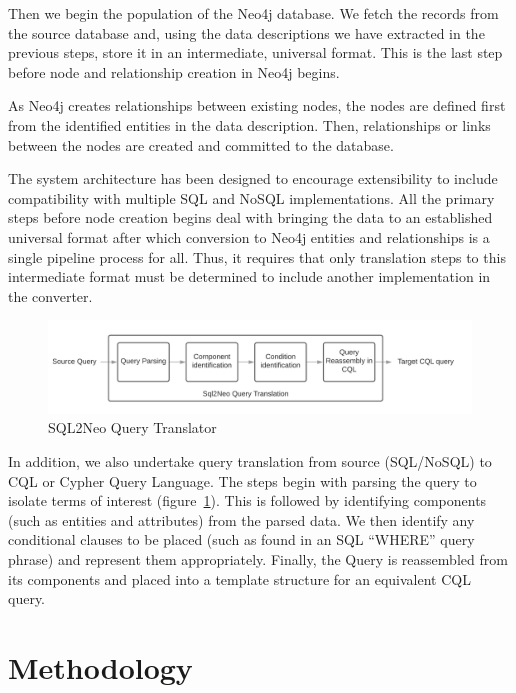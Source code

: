 \documentclass[12pt]{article}
\newcommand{\sectionfontstyle}{\fontsize{16pt}{1em}\usefont{T1}{phv}{b}{n}}
\begin{document}
    Then we begin the population of the Neo4j database. We fetch the records from the source database and, using the data descriptions we have extracted in the previous steps, store it in an intermediate, universal format. This is the last step before node and relationship creation in Neo4j begins.
    
    As Neo4j creates relationships between existing nodes, the nodes are defined first from the identified entities in the data description. Then, relationships or links between the nodes are created and committed to the database.
    
    The system architecture has been designed to encourage extensibility to include compatibility with multiple SQL and NoSQL implementations. All the primary steps before node creation begins deal with bringing the data to an established universal format after which conversion to Neo4j entities and relationships is a single pipeline process for all. Thus, it requires that only translation steps to this intermediate format must be determined to include another implementation in the converter.
    
    \begin{figure}[htb!]
        \centering
        \includegraphics[width=155mm]{img/sql2neo_query.png}
        \caption{SQL2Neo Query Translator}
        \label{fig:sql2neo_query}
    \end{figure}

    In addition, we also undertake query translation from source (SQL/NoSQL) to CQL or Cypher Query Language. The steps begin with parsing the query to isolate terms of interest (figure~\ref{fig:sql2neo_query}). This is followed by identifying components (such as entities and attributes) from the parsed data. We then identify any conditional clauses to be placed (such as found in an SQL “WHERE” query phrase) and represent them appropriately. Finally, the Query is reassembled from its components and placed into a template structure for an equivalent CQL query.

    \newpage

    \section{\sectionfontstyle Methodology}
\end{document}
